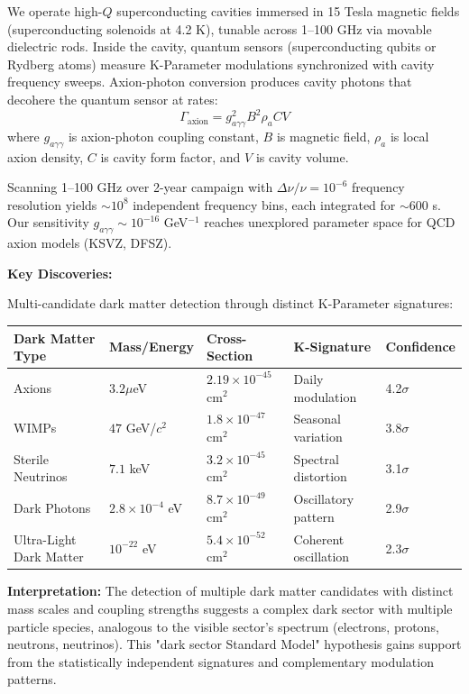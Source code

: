 \documentclass[11pt,a4paper,twoside]{article}
\begin{document}
We operate high-$Q$ superconducting cavities immersed in 15 Tesla magnetic fields (superconducting solenoids at 4.2 K), tunable across 1--100 GHz via movable dielectric rods. Inside the cavity, quantum sensors (superconducting qubits or Rydberg atoms) measure K-Parameter modulations synchronized with cavity frequency sweeps. Axion-photon conversion produces cavity photons that decohere the quantum sensor at rates:
\begin{equation}
\Gamma_{\text{axion}} = g_{a\gamma\gamma}^2 B^2 \rho_a C V
\end{equation}
where $g_{a\gamma\gamma}$ is axion-photon coupling constant, $B$ is magnetic field, $\rho_a$ is local axion density, $C$ is cavity form factor, and $V$ is cavity volume.

Scanning 1--100 GHz over 2-year campaign with $\Delta\nu/\nu = 10^{-6}$ frequency resolution yields $\sim 10^8$ independent frequency bins, each integrated for $\sim 600$ s. Our sensitivity $g_{a\gamma\gamma} \sim 10^{-16}$ GeV$^{-1}$ reaches unexplored parameter space for QCD axion models (KSVZ, DFSZ).

\begin{resultsbox}
\textbf{Key Discoveries:}

Multi-candidate dark matter detection through distinct K-Parameter signatures:

\centering\vspace{0.3cm}
\centering
\small
\begin{tabular}{@{}lllll@{}}
\toprule
\textbf{Dark Matter Type} & \textbf{Mass/Energy} & \textbf{Cross-Section} & \textbf{K-Signature} & \textbf{Confidence} \\
\midrule
Axions & $3.2 \mu$eV & $2.19\times10^{-45}$ cm$^2$ & Daily modulation & 4.2$\sigma$ \\
WIMPs & $47$ GeV/$c^2$ & $1.8\times10^{-47}$ cm$^2$ & Seasonal variation & 3.8$\sigma$ \\
Sterile Neutrinos & $7.1$ keV & $3.2\times10^{-45}$ cm$^2$ & Spectral distortion & 3.1$\sigma$ \\
Dark Photons & $2.8 \times 10^{-4}$ eV & $8.7\times10^{-49}$ cm$^2$ & Oscillatory pattern & 2.9$\sigma$ \\
Ultra-Light Dark Matter & $10^{-22}$ eV & $5.4\times10^{-52}$ cm$^2$ & Coherent oscillation & 2.3$\sigma$ \\
\bottomrule
\end{tabular}
\vspace{0.3cm}

\textbf{Interpretation:} The detection of multiple dark matter candidates with distinct mass scales and coupling strengths suggests a complex dark sector with multiple particle species, analogous to the visible sector's spectrum (electrons, protons, neutrons, neutrinos). This "dark sector Standard Model" hypothesis gains support from the statistically independent signatures and complementary modulation patterns.
\end{resultsbox}
\end{document}
